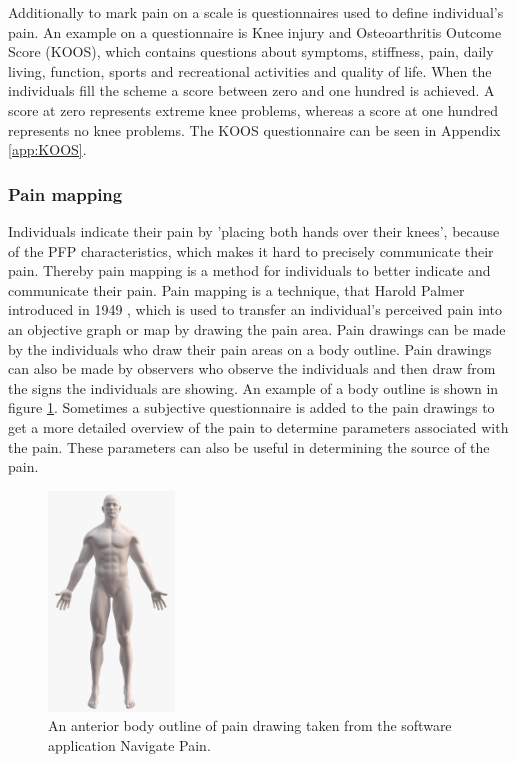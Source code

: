 \noindent
Additionally to mark pain on a scale is questionnaires used to define individual's pain. An example on a questionnaire is Knee injury and Osteoarthritis Outcome Score (KOOS), which contains questions about symptoms, stiffness, pain, daily living, function, sports and recreational activities and quality of life. When the individuals fill the scheme a score between zero and one hundred is achieved. A score at zero represents extreme knee problems, whereas a score at one hundred represents no knee problems.\citep{Roos2003} The KOOS questionnaire can be seen in Appendix \ref{app:KOOS}. 
\noindent 


\subsubsection{Pain mapping}
Individuals indicate their pain by 'placing both hands over their knees', because of the PFP characteristics, which makes it hard to precisely communicate their pain. Thereby pain mapping is a method for individuals to better indicate and communicate their pain. 
\noindent
Pain mapping is a technique, that Harold Palmer introduced in 1949 \citep{Grunnesjo2006}, which is used to transfer an individual's perceived pain into an objective graph or map by drawing the pain area. Pain drawings can be made by the individuals who draw their pain areas on a body outline. Pain drawings can also be made by observers who observe the individuals and then draw from the signs the individuals are showing. An example of a body outline is shown in figure \ref{fig:painmap}. Sometimes a subjective questionnaire is added to the pain drawings to get a more detailed overview of the pain to determine parameters associated with the pain. These parameters can also be useful in determining the source of the pain.\citep{Schott2010}

\begin{figure} [H]
\centering
\includegraphics[width=0.3\textwidth]{figures/painmap}
\caption{An anterior body outline of pain drawing taken from the software application Navigate Pain.}
\label{fig:painmap}
\end{figure}

